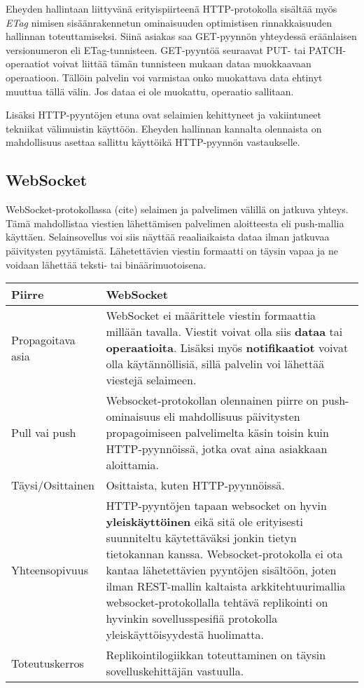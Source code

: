 \documentclass[finnish,twoside,censored,csm,sw-track-2018]{HYthesisML}
\begin{document}
Eheyden hallintaan liittyvänä erityispiirteenä HTTP-protokolla sisältää myös \textit{ETag} nimisen sisäänrakennetun ominaisuuden optimistisen rinnakkaisuuden hallinnan toteuttamiseksi. Siinä asiakas saa GET-pyynnön yhteydessä eräänlaisen versionumeron eli ETag-tunnisteen. GET-pyyntöä seuraavat PUT- tai PATCH-operaatiot voivat liittää tämän tunnisteen mukaan dataa muokkaavaan operaatioon. Tällöin palvelin voi varmistaa onko muokattava data ehtinyt muuttua tällä välin. Jos dataa ei ole muokattu, operaatio sallitaan. 

Lisäksi HTTP-pyyntöjen etuna ovat selaimien kehittyneet ja vakiintuneet tekniikat välimuistin käyttöön. Eheyden hallinnan kannalta olennaista on mahdollisuus asettaa sallittu käyttöikä HTTP-pyynnön vastaukselle.

\subsection{WebSocket}

WebSocket-protokollassa (cite) selaimen ja palvelimen välillä on jatkuva yhteys. Tämä mahdollistaa viestien lähettämisen palvelimen aloitteesta eli push-mallia käyttäen. Selainsovellus voi siis näyttää reaaliaikaista dataa ilman jatkuvaa päivitysten pyytämistä. Lähetettävien viestin formaatti on täysin vapaa ja ne voidaan lähettää teksti- tai binäärimuotoisena.

\begin{center}
\begin{tabular}{ | m{3.3cm} | m{11.7cm} | }
 \hline
 \textbf{Piirre} & \textbf{WebSocket}\\ 
 \hline
 Propagoitava asia & WebSocket ei määrittele viestin formaattia millään tavalla. Viestit voivat olla siis \textbf{dataa} tai \textbf{operaatioita}. Lisäksi myös \textbf{notifikaatiot} voivat olla käytännöllisiä, sillä palvelin voi lähettää viestejä selaimeen. \\
 \hline
 Pull vai push & Websocket-protokollan olennainen piirre on {push}-ominaisuus eli mahdollisuus päivitysten propagoimiseen palvelimelta käsin toisin kuin HTTP-pyynnöissä, jotka ovat aina asiakkaan aloittamia. \\
 \hline
 Täysi/Osittainen & Osittaista, kuten HTTP-pyynnöissä. \\
 \hline
 Yhteensopivuus & HTTP-pyyntöjen tapaan websocket on hyvin \textbf{yleiskäyttöinen} eikä sitä ole erityisesti suunniteltu käytettäväksi jonkin tietyn tietokannan kanssa. Websocket-protokolla ei ota kantaa lähetettävien pyyntöjen sisältöön, joten ilman REST-mallin kaltaista arkkitehtuurimallia websocket-protokollalla tehtävä replikointi on hyvinkin sovellusspesifiä protokolla yleiskäyttöisyydestä huolimatta. \\
 \hline
 Toteutuskerros & Replikointilogiikkan toteuttaminen on täysin sovelluskehittäjän vastuulla. \\
 \hline
\end{tabular}
\end{center}
\end{document}

